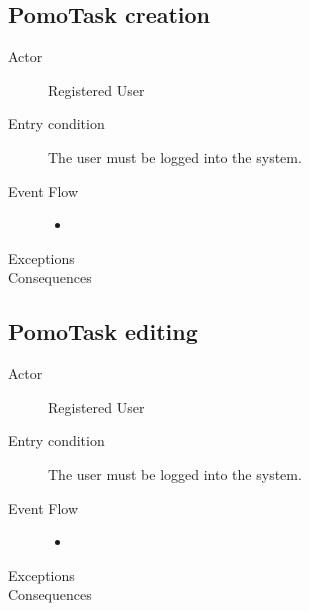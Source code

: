 		\subsection{PomoTask creation}

			\begin{description}

				\item[Actor] Registered User
			
				\item[Entry condition] The user must be logged into the system.

				\item[Event Flow]\hfill

					\begin{itemize}

						\item

					\end{itemize}

				\item[Exceptions]

				\item[Consequences]

			\end{description}

		\subsection{PomoTask editing}

			\begin{description}

				\item[Actor] Registered User
			
				\item[Entry condition] The user must be logged into the system.

				\item[Event Flow]\hfill

					\begin{itemize}

						\item

					\end{itemize}

				\item[Exceptions]

				\item[Consequences]

			\end{description}

